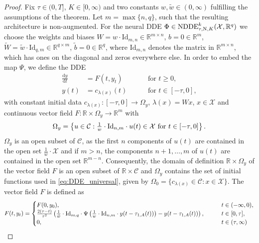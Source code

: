 \documentclass[10pt]{article}
\numberwithin{equation}{section}
\newcommand*{\dd}{\mathrm{d}}
\begin{document}
	\begin{proof}
		Fix $\tau\in(0,T]$, $K \in[0,\infty)$ and two constants $w,\tilde{w}\in(0,\infty)$ fulfilling the assumptions of the theorem. Let $m = \max\{n,q\}$, such that the resulting architecture is non-augmented. For the neural DDE $\Phi \in \textup{NDDE}^k_{\tau,\textup{N},K}(\mathcal{X},\mathbb{R}^q)$ we choose the weights and biases $W = w \cdot \text{Id}_{m,n} \in \mathbb{R}^{m \times n}$, $b = 0 \in \mathbb{R}^m$, $\widetilde{W} = \tilde{w} \cdot \text{Id}_{q,m} \in \mathbb{R}^{q \times m}$, $\tilde{b} = 0 \in \mathbb{R}^q$, where $\text{Id}_{m,n}$ denotes the matrix in $\mathbb{R}^{m\times n}$, which has ones on the diagonal and zeros everywhere else. In order to embed the map $\Psi$, we define the DDE
		\begin{equation}\label{eq:DDE_universal}
			\begin{aligned}
				\frac{\dd y}{\dd t} &= F(t,y_t) \qquad &&\text{for } t\geq 0, \\  
				y(t) &= c_{\lambda(x)}(t) &&\text{for } t \in [-\tau,0],
			\end{aligned}
		\end{equation}
		with constant initial data $c_{\lambda(x)}:[-\tau,0]\rightarrow \Omega_y$, $\lambda(x) = Wx$, $x \in \mathcal{X}$ and continuous vector field $	F: \mathbb{R}\times \Omega_y\rightarrow \mathbb{R}^m$ with 
		\begin{equation*}
			\Omega_y =   \left\{u\in\mathcal{C}: \tfrac{1}{w}\cdot \textup{Id}_{n,m}\cdot u(t) \in \mathcal{X} \text{ for } t \in [-\tau,0]\right\}.
		\end{equation*}
		$\Omega_y$ is an open subset of $\mathcal{C}$, as the first $n$ components of $u(t)$ are contained in the open set $\frac{1}{w}\cdot \mathcal{X}$ and if $m>n$, the components $n+1,\ldots,m$ of $u(t)$ are contained in the open set $\mathbb{R}^{m-n}$.  Consequently, the domain of definition  $\mathbb{R}\times \Omega_y$ of the vector field $F$ is an open subset of $\mathbb{R} \times \mathcal{C}$ and $\Omega_y$ contains the  set of initial functions used in \eqref{eq:DDE_universal}, given by $\Omega_0 = \{c_{\lambda(x)}\in\mathcal{C}:x\in\mathcal{X}\}$. The vector field $F$ is defined as
		\begin{equation}\label{eq:vectorfield_universal}
			F(t,y_t) = \begin{cases} F(0,y_0), & t\in(-\infty,0), \\\frac{2(\tau-t)}{\tau^2} \left(\frac{1}{\tilde w}\cdot \textup{Id}_{m,q}\cdot \Psi\left(\frac{1}{w}\cdot \textup{Id}_{n,m}\cdot y(t-\tau_{1,A}(t))\right)-y(t-\tau_{1,A}(t))\right), \qquad &t \in [0,\tau], \\ 0, &t \in (\tau,\infty)

\end{cases}
\end{equation}
\end{proof}
\end{document}

